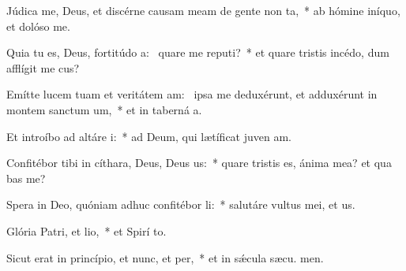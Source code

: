 \item Júdica me, Deus, et discérne causam meam de gente non ta,~* ab hómine iníquo, et dolóso  me.
\item Quia tu es, Deus, fortitúdo a:~\pscross{} quare me reputi?~* et quare tristis incédo, dum afflígit me cus?
\item Emítte lucem tuam et veritátem am:~\pscross{} ipsa me deduxérunt, et adduxérunt in montem sanctum um,~* et in taberná a.
\item Et introíbo ad altáre i:~* ad Deum, qui lætíficat juven am.
\item Confitébor tibi in cíthara, Deus, Deus us:~* quare tristis es, ánima mea? et qua bas me?
\item Spera in Deo, quóniam adhuc confitébor li:~* salutáre vultus mei, et  us.
\item Glória Patri, et lio,~* et Spirí to.
\item Sicut erat in princípio, et nunc, et per,~* et in sǽcula sæcu. men.
